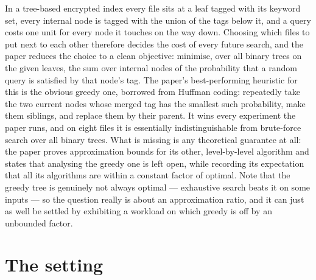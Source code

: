 \documentclass{conjura-conjecture}
\begin{document}

\vspace{0.4em}

\begin{informalconjecture}
In a tree-based encrypted index every file sits at a leaf tagged with its
keyword set, every internal node is tagged with the union of the tags
below it, and a query costs one unit for every node it touches on the way
down. Choosing which files to put next to each other therefore decides
the cost of every future search, and the paper reduces the choice to a
clean objective: minimise, over all binary trees on the given leaves, the
sum over internal nodes of the probability that a random query is
satisfied by that node's tag. The paper's best-performing heuristic for
this is the obvious greedy one, borrowed from Huffman coding: repeatedly
take the two current nodes whose merged tag has the smallest such
probability, make them siblings, and replace them by their parent. It
wins every experiment the paper runs, and on eight files it is
essentially indistinguishable from brute-force search over all binary
trees. What is missing is any theoretical guarantee at all: the paper
proves approximation bounds for its other, level-by-level algorithm and
states that analysing the greedy one is left open, while recording its
expectation that all its algorithms are within a constant factor of
optimal. Note that the greedy tree is genuinely not always optimal ---
exhaustive search beats it on some inputs --- so the question really is
about an approximation ratio, and it can just as well be settled by
exhibiting a workload on which greedy is off by an unbounded factor.
\end{informalconjecture}

\section{The setting}\label{sec:setting}
\end{document}
